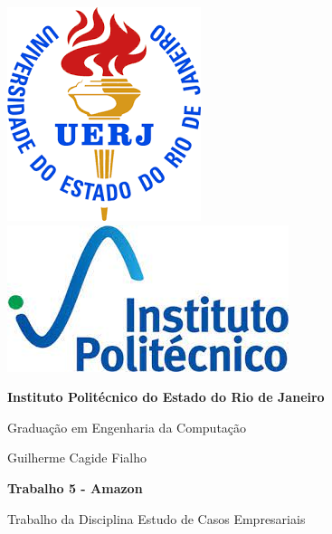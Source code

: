 \begin{titlepage}
    \centering

    \includegraphics[height=0.151\textwidth]{header/contra-capa/assets/uerj.png}\hfill
    \includegraphics[height=0.15\textwidth]{header/contra-capa/assets/iprj.jpeg}\hfill

    \vspace{2cm} %

    {\Large\bfseries Instituto Politécnico do Estado do Rio de Janeiro \par}
    \vspace{0.5cm}
    {\large Graduação em Engenharia da Computação \par}

    \vspace{3cm} %

    {\large Guilherme Cagide Fialho \par}

    \vspace{1.5cm}

    {\large\bfseries Trabalho 5 - Amazon \par}

    \vspace{1cm} %

    \begin{flushright}
        \begin{minipage}{0.5\textwidth}
            \large
            \raggedleft %
            Trabalho da Disciplina Estudo de Casos Empresariais
        \end{minipage}
    \end{flushright}


\end{titlepage}
